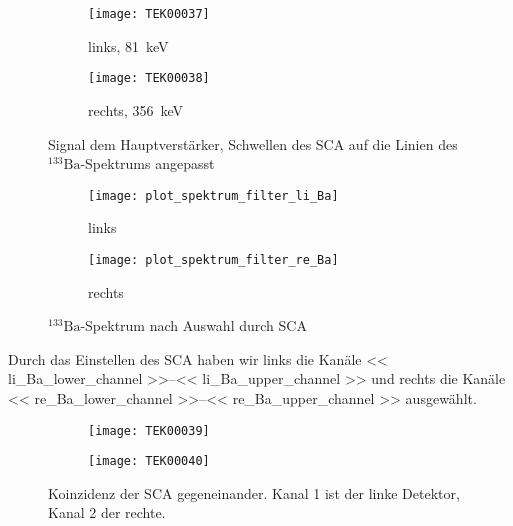 \documentclass[11pt, ngerman, fleqn, DIV=15, headinclude, BCOR=2cm]{scrreprt}
\begin{document}
\begin{figure}
	\centering
	\begin{subfigure}{0.49 \textwidth}
		\texttt{[image: TEK00037]}
		\caption{%
			links, \SI{81}{\kilo\electronvolt}
		}
		\label{fig:ba_slow_signal_sca_eingestellt-li}
	\end{subfigure}
	\begin{subfigure}{0.49 \textwidth}
		\texttt{[image: TEK00038]}
		\caption{%
			rechts, \SI{356}{\kilo\electronvolt}
		}
		\label{fig:ba_slow_signal_sca_eingestellt-re}
	\end{subfigure}
	\caption{%
		Signal dem Hauptverstärker, Schwellen des SCA auf die Linien
		des $^{133}\text{Ba}$-Spektrums angepasst
	}
	\label{fig:ba_slow_signal_sca_eingestellt}
\end{figure}

\begin{figure}
	\centering
	\begin{subfigure}{0.49 \textwidth}
		\texttt{[image: plot\_spektrum\_filter\_li\_Ba]}
		\caption{%
			links
		}
		\label{fig:ba_slow_sca_eingestellt-li_plot}
	\end{subfigure}
	\begin{subfigure}{0.49 \textwidth}
		\texttt{[image: plot\_spektrum\_filter\_re\_Ba]}
		\caption{%
			rechts
		}
		\label{fig:ba_slow_sca_eingestellt-re_plot}
	\end{subfigure}
	\caption{%
		$^{133}\text{Ba}$-Spektrum nach Auswahl durch SCA
	}
	\label{fig:ba_slow_signal_sca_eingestellt_plot}
\end{figure}

Durch das Einstellen des SCA haben wir links die Kanäle
\numrange{<< li_Ba_lower_channel >>}{<< li_Ba_upper_channel >>} und rechts
die Kanäle
\numrange{<< re_Ba_lower_channel >>}{<< re_Ba_upper_channel >>} ausgewählt.


\begin{figure}
	\centering
	\begin{subfigure}{0.49 \textwidth}
		\texttt{[image: TEK00039]}
	\end{subfigure}
	\begin{subfigure}{0.49 \textwidth}
		\texttt{[image: TEK00040]}
	\end{subfigure}
	\caption{%
		Koinzidenz der SCA gegeneinander. Kanal 1 ist der linke
		Detektor, Kanal 2 der rechte.
	}
	\label{fig:ba_slow_signal_sca_koinzidenz}
\end{figure}
\end{document}
